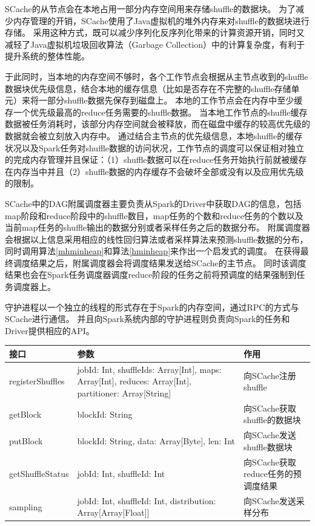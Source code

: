 SCache的从节点会在本地占用一部分内存空间用来存储shuffle的数据块。
为了减少内存管理的开销，SCache使用了Java虚拟机的堆外内存来对shuffle的数据块进行存储。
采用这种方式，既可以减少序列化反序列化带来的计算资源开销，同时又减轻了Java虚拟机垃圾回收算法（Garbage Collection）中的计算复杂度，有利于提升系统的整体性能。

于此同时，当本地的内存空间不够时，各个工作节点会根据从主节点收到的shuffle数据块优先级信息，结合本地的缓存信息（比如是否存在不完整的shuffle存储单元）来将一部分shuffle数据先保存到磁盘上。
本地的工作节点会在内存中至少缓存一个优先级最高的reduce任务需要的shuffle数据。
当本地工作节点的shuffle缓存数据被任务消耗时，该部分内存空间就会被释放，而在磁盘中缓存的较高优先级的数据就会被立刻放入内存中。
通过结合主节点的优先级信息，本地shuffle的缓存状况以及Spark任务对shuffle数据的访问状况，工作节点的调度可以保证相对独立的完成内存管理并且保证：（1）shuffle数据可以在reduce任务开始执行前就被缓存在内存当中并且（2）shuffle数据的内存缓存不会破坏全部或没有以及应用优先级的限制。

SCache中的DAG附属调度器主要负责从Spark的Driver中获取DAG的信息，包括map阶段和reduce阶段中的shuffle数目，map任务的个数和reduce任务的个数以及当前map任务的shuffle输出的数据分别或者采样任务之后的数据分布。
附属调度器会根据以上信息采用相应的线性回归算法或者采样算法来预测shuffle数据的分布，同时调用算法\ref{mhminheap}和算法\ref{hminheap}来作出一个启发式的调度。
在获得最终调度结果之后，附属调度器会将调度结果发送给SCache的主节点。
同时该调度结果也会在Spark任务调度器调度reduce阶段的任务之前将预调度的结果强制到任务调度器上。

守护进程以一个独立的线程的形式存在于Spark的内存空间，通过RPC的方式与SCache进行通信。
并且向Spark系统内部的守护进程则负责向Spark的任务和Driver提供相应的API。

\begin{table}[!hpb]
    \centering
    \begin{tabular}{ | m{2.5cm} | m{8cm} | m{5cm} | }
        \hline
        接口 & 参数 & 作用 \\ [0.5ex]
        \hline
        \hline
        registerShuffles & jobId: Int, shuffleIds: Array[Int], maps: Array[Int], reduces: Array[Int], partitioner: Array[String] & 向SCache注册shuffle \\ \hline
        getBlock & blockId: String & 向SCache获取shuffle的数据块 \\ \hline
        putBlock & blockId: String, data: Array[Byte], len: Int & 向SCache发送shuffle数据块 \\ \hline
        getShuffleStatus & jobId: Int, shuffleId: Int & 向SCache获取reduce任务的预调度结果 \\ \hline
        sampling & jobId: Int, shuffleId: Int, distribution: Array[Array[Float]] & 向SCache发送采样分布 \\ 
        \hline
    \end{tabular}
\end{table}

